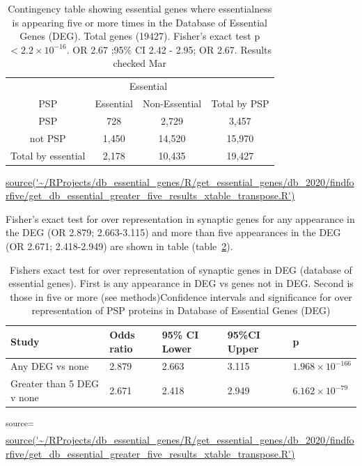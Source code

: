    \begin{table}
\centering
\begin{tabular}{cccc}
\toprule
& \multicolumn{2}{c}{Essential} & \\
\cmidrule{2-3}
    PSP & Essential &  Non-Essential & Total by PSP\vspace{1mm} \\
\midrule 
PSP      &   728     &     2,729 & 3,457\vspace{1mm}\\
not PSP    &  1,450      &    14,520  & 15,970\vspace{1mm}\\
\midrule
 Total by essential & 2,178 & 10,435 &  19,427\\ 

 
\bottomrule
\end{tabular}
\caption{Contingency table showing essential genes where essentialness is appearing five or more times  in the Database of Essential Genes (DEG). Total genes (19427).  Fisher's exact test p$<2.2\times10^{-16}$. OR 2.67 ;95\% CI 2.42 - 2.95; OR 2.67. Results checked Mar}
\tiny\url{source('~/RProjects/db_essential_genes/R/get_essential_genes/db_2020/findforfive/get_db_essential_greater_five_results_xtable_transpose.R')}  
\label{tab:DEG five or more appearances in contingency table PSP vs not PSP}
\end{table}
    
Fisher's exact test  for over representation in synaptic genes for any appearance in the DEG (OR 2.879; 2.663-3.115) and more than five appearances in the DEG (OR 2.671; 2.418-2.949) are shown in table (table~\ref{tab:Fishers exact results DEG}).

\begin{table}[ht]
\centering
\begin{tabular}{lllll}

  \toprule
Study & Odds ratio & 95\% CI Lower & 95\%CI Upper & p \\ 
  \midrule
Any DEG vs none & 2.879 & 2.663 & 3.115 & $1.968 \times 10^{-166}$\vspace{1mm} \\ 
  Greater than 5 DEG v none & 2.671 & 2.418 & 2.949 & $6.162 \times 10^{-79}$\vspace{1mm} \\ 
   \bottomrule
\end{tabular}
\caption{Fishers exact test for over representation of synaptic genes in DEG (database of essential genes). First is any appearance in DEG vs genes not in DEG. Second is those in five or more (see methods)Confidence intervals and significance for over representation of PSP proteins in Database of Essential Genes (DEG)}
\tiny\textsuperscript{source=} \url{source('~/RProjects/db_essential_genes/R/get_essential_genes/db_2020/findforfive/get_db_essential_greater_five_results_xtable_transpose.R')}
\label{tab:Fishers exact results DEG}
\end{table}

